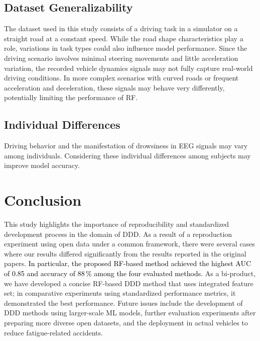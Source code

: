 \documentclass[letterpaper, 10 pt, conference]{ieeeconf}  %
\newcommand{\Review}[1]{\textcolor{black}{#1}}
\newcommand{\Impl}[1]{\textsc{#1}}
\begin{document}
\subsection{Dataset Generalizability}
The dataset used in this study consists of a driving task in a simulator on a straight road at a constant speed. 
While the road shape characteristics play a role, variations in task types could also influence model performance. Since the driving scenario involves minimal steering movements and little acceleration variation, the recorded vehicle dynamics signals may not fully capture real-world driving conditions. 
In more complex scenarios with curved roads or frequent acceleration and deceleration, these signals may behave very differently, potentially limiting the performance of \Impl{RF}.


\subsection{Individual Differences}
Driving behavior and the manifestation of drowsiness in EEG signals may vary among individuals.
Considering these individual differences among subjects may improve model accuracy.

\section{Conclusion}\label{sec:concl}

This study highlights the importance of reproducibility and standardized development process in the domain of DDD. 
As a result of a reproduction experiment using open data under a common framework, there were several cases where our results differed significantly from the results reported in the original papers.
\Review{In particular, the proposed RF-based method achieved the highest AUC of 0.85 and accuracy of 88\,\% among the four evaluated methods.}
As a bi-product, we have developed a concise RF-based DDD method that uses integrated feature set;
in comparative experiments using standardized performance metrics, it demonstrated the best performance.
%
Future issues include the development of DDD methods using larger-scale ML models, further evaluation experiments after preparing more diverse open datasets, and the deployment in actual vehicles to reduce fatigue-related accidents.
\end{document}
